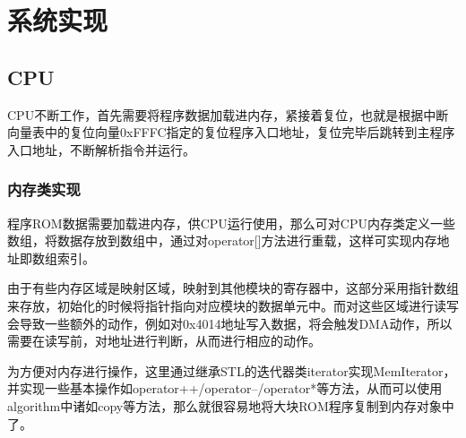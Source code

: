 \documentclass[a4paper]{ltxdoc}
\begin{document}
{\section{系统实现}

\subsection{CPU}
CPU不断工作，首先需要将程序数据加载进内存，紧接着复位，也就是根据中断向量表中的复位向量0xFFFC指定的复位程序入口地址，复位完毕后跳转到主程序入口地址，不断解析指令并运行。

\subsubsection{内存类实现}
程序ROM数据需要加载进内存，供CPU运行使用，那么可对CPU内存类定义一些数组，将数据存放到数组中，通过对operator[]方法进行重载，这样可实现内存地址即数组索引。

由于有些内存区域是映射区域，映射到其他模块的寄存器中，这部分采用指针数组来存放，初始化的时候将指针指向对应模块的数据单元中。而对这些区域进行读写会导致一些额外的动作，例如对0x4014地址写入数据，将会触发DMA动作，所以需要在读写前，对地址进行判断，从而进行相应的动作。


为方便对内存进行操作，这里通过继承STL的迭代器类iterator实现MemIterator，并实现一些基本操作如operator++/operator--/operator*等方法，从而可以使用algorithm中诸如copy等方法，那么就很容易地将大块ROM程序复制到内存对象中了。


}
\end{document}
